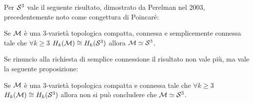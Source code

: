 \eproof
Per $ \mathcal{S}^{3} $ vale il seguente risultato, dimostrato da Perelman nel
2003, precedentemente noto come congettura di Poincaré:
\begin{proposition}
  Se $ \mathcal{M} $ è una $ 3 $-varietà topologica compatta, connessa e semplicemente
  connessa tale che $ \forall k \geq 3 $ $ H_k(\mathcal{M}) \cong H_k(\mathcal{S}^{3}) $ allora $ \mathcal{M} \simeq \mathcal{S}^{3} $.
\end{proposition}
Se rinuncio alla richiesta di semplice connessione il risultato non vale più, ma
vale la seguente proposizione:
\begin{proposition}
  Se $ \mathcal{M} $ è una $ 3 $-varietà topologica compatta e connessa tale che $ \forall k \geq 3 $
  $ H_k(\mathcal{M}) \cong H_k(\mathcal{S}^{3}) $ allora non si può concludere che $ \mathcal{M} \simeq \mathcal{S}^{3} $.
\end{proposition}
